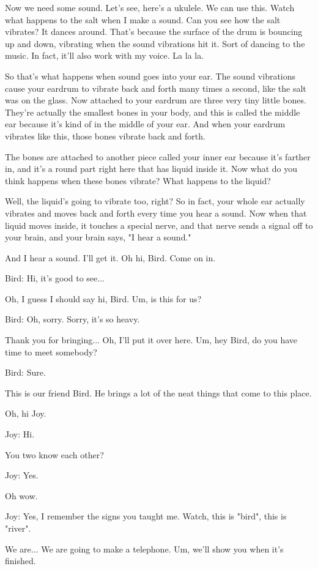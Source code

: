 Now we need some sound. Let's see, here's a ukulele. We can use this. Watch what happens to the salt when I make a sound. Can you see how the salt vibrates? It dances around. That's because the surface of the drum is bouncing up and down, vibrating when the sound vibrations hit it. Sort of dancing to the music. In fact, it'll also work with my voice. La la la.

So that's what happens when sound goes into your ear. The sound vibrations cause your eardrum to vibrate back and forth many times a second, like the salt was on the glass. Now attached to your eardrum are three very tiny little bones. They're actually the smallest bones in your body, and this is called the middle ear because it's kind of in the middle of your ear. And when your eardrum vibrates like this, those bones vibrate back and forth.

The bones are attached to another piece called your inner ear because it's farther in, and it's a round part right here that has liquid inside it. Now what do you think happens when these bones vibrate? What happens to the liquid?

Well, the liquid's going to vibrate too, right? So in fact, your whole ear actually vibrates and moves back and forth every time you hear a sound. Now when that liquid moves inside, it touches a special nerve, and that nerve sends a signal off to your brain, and your brain says, "I hear a sound."

And I hear a sound. I'll get it. Oh hi, Bird. Come on in.

Bird: Hi, it's good to see...

Oh, I guess I should say hi, Bird. Um, is this for us?

Bird: Oh, sorry. Sorry, it's so heavy.

Thank you for bringing... Oh, I'll put it over here. Um, hey Bird, do you have time to meet somebody?

Bird: Sure.

This is our friend Bird. He brings a lot of the neat things that come to this place.

Oh, hi Joy.

Joy: Hi.

You two know each other?

Joy: Yes.

Oh wow.

Joy: Yes, I remember the signs you taught me. Watch, this is "bird", this is "river".

We are... We are going to make a telephone. Um, we'll show you when it's finished.

